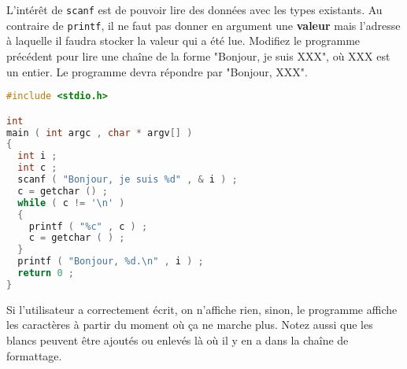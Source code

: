 \question L'intérêt de \texttt{scanf} est de pouvoir lire des données
avec les types existants. Au contraire de \texttt{printf}, il ne faut
pas donner en argument une \textbf{valeur} mais l'adresse à laquelle
il faudra stocker la valeur qui a été lue. Modifiez le programme
précédent pour lire une chaîne de la forme "Bonjour, je suis XXX", où
XXX est un entier. Le programme devra répondre par "Bonjour, XXX".

\begin{solutioncachee}
  \begin{lstlisting}[language=C]
 #include <stdio.h>

int
main ( int argc , char * argv[] )
{
  int i ;
  int c ;
  scanf ( "Bonjour, je suis %d" , & i ) ;
  c = getchar () ;
  while ( c != '\n' )
  {
    printf ( "%c" , c ) ;
    c = getchar ( ) ;
  }
  printf ( "Bonjour, %d.\n" , i ) ;
  return 0 ;
}   
  \end{lstlisting}
  Si l'utilisateur a correctement écrit, on n'affiche rien, sinon, le
  programme affiche les caractères à partir du moment où ça ne marche
  plus. Notez aussi que les blancs peuvent être ajoutés ou enlevés là
  où il y en a dans la chaîne de formattage.
\end{solutioncachee}